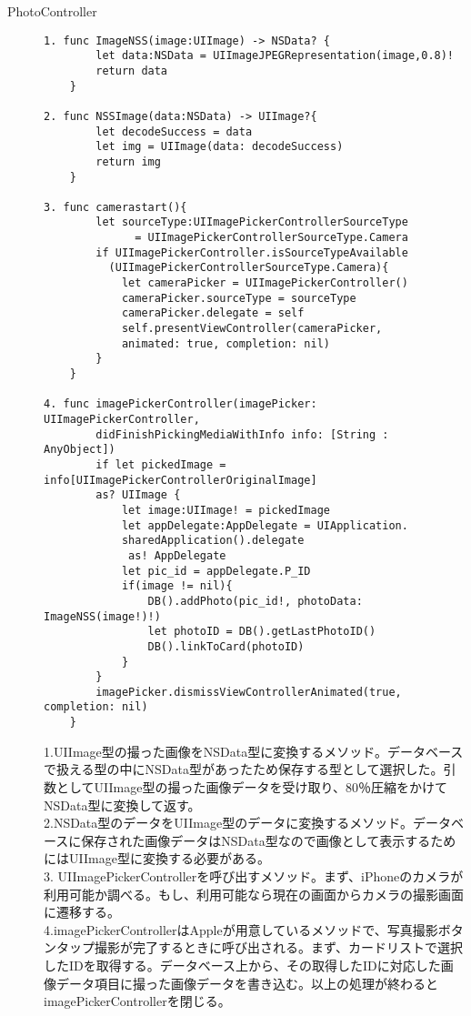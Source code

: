 \begin{description}
\item[PhotoController]\mbox{} 
\begin{lstlisting}[basicstyle=\ttfamily\footnotesize, frame=single]
1. func ImageNSS(image:UIImage) -> NSData? {
        let data:NSData = UIImageJPEGRepresentation(image,0.8)!
        return data
    }
    
2. func NSSImage(data:NSData) -> UIImage?{
        let decodeSuccess = data
        let img = UIImage(data: decodeSuccess)
        return img
    }

3. func camerastart(){
        let sourceType:UIImagePickerControllerSourceType 
        	  = UIImagePickerControllerSourceType.Camera
        if UIImagePickerController.isSourceTypeAvailable
          (UIImagePickerControllerSourceType.Camera){
            let cameraPicker = UIImagePickerController()
            cameraPicker.sourceType = sourceType
            cameraPicker.delegate = self
            self.presentViewController(cameraPicker, 
            animated: true, completion: nil)
        }
    }

4. func imagePickerController(imagePicker: UIImagePickerController, 
        didFinishPickingMediaWithInfo info: [String : AnyObject]) 
        if let pickedImage = info[UIImagePickerControllerOriginalImage] 
        as? UIImage {
            let image:UIImage! = pickedImage
            let appDelegate:AppDelegate = UIApplication.
            sharedApplication().delegate
             as! AppDelegate
            let pic_id = appDelegate.P_ID
            if(image != nil){
                DB().addPhoto(pic_id!, photoData: ImageNSS(image!)!)
                let photoID = DB().getLastPhotoID()
                DB().linkToCard(photoID)
            }
        }
        imagePicker.dismissViewControllerAnimated(true, completion: nil)
    }
 \end{lstlisting}

1.UIImage型の撮った画像をNSData型に変換するメソッド。データベースで扱える型の中にNSData型があったため保存する型として選択した。引数としてUIImage型の撮った画像データを受け取り、80％圧縮をかけてNSData型に変換して返す。\\
2.NSData型のデータをUIImage型のデータに変換するメソッド。データベースに保存された画像データはNSData型なので画像として表示するためにはUIImage型に変換する必要がある。\\
3. UIImagePickerControllerを呼び出すメソッド。まず、iPhoneのカメラが利用可能か調べる。もし、利用可能なら現在の画面からカメラの撮影画面に遷移する。\\
4.imagePickerControllerはAppleが用意しているメソッドで、写真撮影ボタンタップ撮影が完了するときに呼び出される。まず、カードリストで選択したIDを取得する。データベース上から、その取得したIDに対応した画像データ項目に撮った画像データを書き込む。以上の処理が終わるとimagePickerControllerを閉じる。\\


\end{description}

